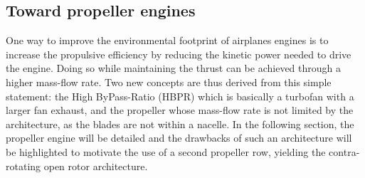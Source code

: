 \subsection{Toward propeller engines}
\label{sub:cror_toward_propeller}

One way to improve the environmental footprint of
airplanes engines is to increase the propulsive efficiency
by reducing the kinetic power needed to drive the engine.
Doing so while maintaining the thrust can be achieved through
a higher mass-flow rate. Two new concepts are thus derived from
this simple statement: the High ByPass-Ratio (HBPR) which
is basically a turbofan with a larger fan exhaust, and the
propeller whose mass-flow rate is not limited
by the architecture, as the blades are not within a nacelle.
In the following section, the propeller engine will be detailed
and the drawbacks of such an architecture will be highlighted to
motivate the use
of a second propeller row, yielding the contra-rotating open rotor
architecture.


